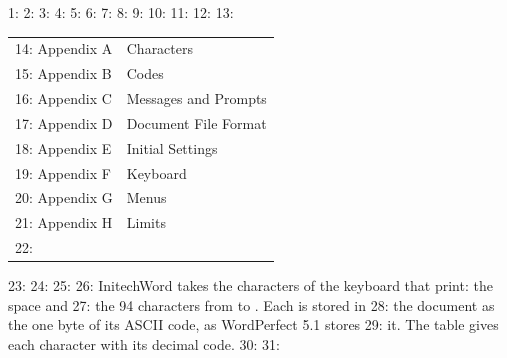 1: %
2: %
3: %
4: %
5: %
6: %
7: %
8: %
9: %
10: %
11: 
12: 
13: \begin{tabular}{@{}ll@{}}
14: Appendix A & Characters\\
15: Appendix B & Codes\\
16: Appendix C & Messages and Prompts\\
17: Appendix D & Document File Format\\
18: Appendix E & Initial Settings\\
19: Appendix F & Keyboard\\
20: Appendix G & Menus\\
21: Appendix H & Limits\\
22: \end{tabular}
23: 
24: %
25: 
26: InitechWord takes the characters of the keyboard that print: the space and
27: the 94 characters from \Scr{!} to \Scr{\textasciitilde}.  Each is stored in
28: the document as the one byte of its ASCII code, as WordPerfect 5.1 stores
29: it.  The table gives each character with its decimal code.
30: 
31: \par\addvspace{6pt}
